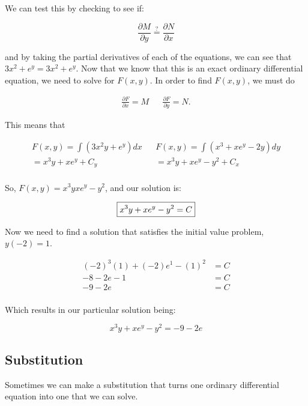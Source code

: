 \begin{problem}
    We can test this by checking to see if:
    
    \begin{equation}
      \frac{\partial M}{\partial y}\stackrel{?}{=}\frac{\partial N}{\partial x}
    \end{equation}

    and by taking the partial derivatives of each of the equations, we can see that $3x^2+e^y=3x^2+e^y$. Now that we know that this is an exact ordinary differential equation, we need to solve for $F(x,y)$. In order to find $F(x,y)$, we must do 

    \begin{align}
      \frac{\partial F}{\partial x}=M && \frac{\partial F}{\partial y}=N.
      \end{align}

      This means that 

      \begin{align}
        F(x,y)=\int(3x^2y+e^y)dx && F(x,y)=\int(x^3+xe^y-2y)dy\\
        =x^3y+xe^y+C_y && =x^3y+xe^y-y^2+C_x\\
      \end{align}

      So, $F(x,y)=x^3yxe^y-y^2$, and our solution is:

      \begin{equation}
        \boxed{x^3y+xe^y-y^2=C}\\
      \end{equation}

      Now we need to find a solution that satisfies the initial value problem, $y(-2)=1$.
      
      \begin{align}
        (-2)^3(1)+(-2)e^1-(1)^2&=C\\
        -8-2e-1&=C\\
        -9-2e&=C\\
      \end{align}

      Which results in our particular solution being:

      \begin{equation}
        \boxed{x^3y+xe^y-y^2=-9-2e}
      \end{equation}
    \end{problem}

  \subsection{Substitution}
    Sometimes we can make a substitution that turns one ordinary differential equation into one that we can solve.
    

